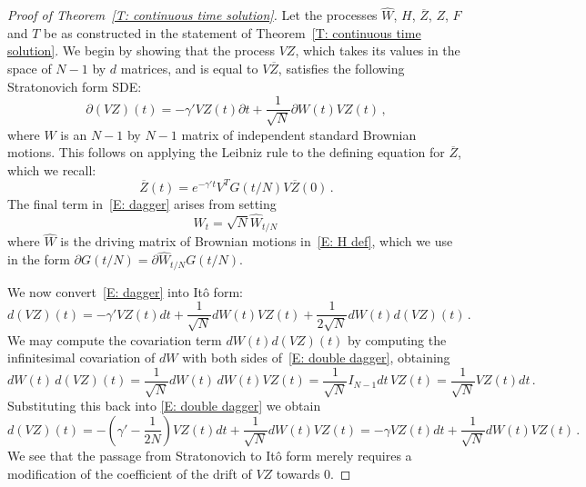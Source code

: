 \documentclass[12pt]{article}
\newcommand{\1}{\mathbf{1}}
\begin{document}
\begin{proof}[Proof of Theorem~\ref{T: continuous time solution}]
Let the processes $\hat{W}$, $H$, $\overline{Z}$, $Z$, $F$ and $T$ be as constructed in the statement of Theorem~\ref{T: continuous time solution}.
We begin by showing that the process $VZ$, which takes its values in the space of $N-1$ by $d$ matrices, and is equal to $V\overline{Z}$, satisfies the following Stratonovich form SDE:
\begin{equation}\label{E: dagger}
\partial(VZ)(t) = - \gamma' VZ(t) \partial t + \frac{1}{\sqrt{N}} \partial W(t) VZ(t)\,,
\end{equation}
where $W$ is an $N-1$ by $N-1$ matrix of independent standard Brownian motions. This follows on applying the Leibniz rule to the defining equation for $\overline{Z}$, which we recall:
$$\overline{Z}(t) = e^{-\gamma' t} V^T G(t/N) V\overline{Z}(0)\,.$$
The final term in~\eqref{E: dagger} arises from setting $$W_t = \sqrt{N}\hat{W}_{t/N}\,$$ where $\hat{W}$ is the driving matrix of Brownian motions in~\eqref{E: H def}, which we use in the form $\partial G(t/N) = \partial \hat{W}_{t/N} G(t/N)$.  

We now convert~\eqref{E: dagger} into It\^{o} form:
\begin{equation}\label{E: double dagger}
d(VZ)(t) = -\gamma' VZ(t) dt + \frac{1}{\sqrt{N}} dW(t) VZ(t) + \frac{1}{2\sqrt{N}} dW(t)d(VZ)(t)\,.
\end{equation}
We may compute the covariation term $dW(t)d(VZ)(t)$ by computing the infinitesimal covariation of $dW$ with both sides of~\eqref{E: double dagger}, obtaining
$$ dW(t)\, d(VZ)(t) =  \frac{1}{\sqrt{N}} dW(t)\, dW(t) VZ(t) = \frac{1}{\sqrt{N}} I_{N-1} dt\, VZ(t) = \frac{1}{\sqrt{N}} VZ(t) dt\,.$$
Substituting this back into \eqref{E: double dagger} we obtain 
\begin{equation}\label{E: triple dagger}
d(VZ)(t) = -\left(\gamma'-\frac{1}{2N}\right) VZ(t) dt + \frac{1}{\sqrt{N}} dW(t) VZ(t)  = -\gamma VZ(t) dt + \frac{1}{\sqrt{N}}dW(t)VZ(t)\,.
\end{equation}
We see that the passage from Stratonovich to It\^{o} form merely requires a modification of the coefficient of the drift of $VZ$ towards $0$.



\end{proof}
\end{document}

